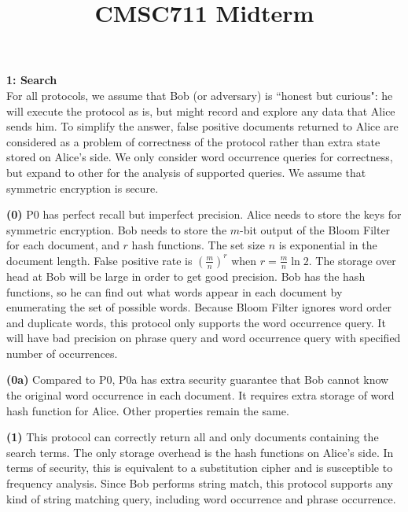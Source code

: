 \documentclass[10pt]{article}
\title{CMSC711 Midterm}
\newcommand\question[2]{\vspace{.1in}\textbf{#1: #2}\vspace{.5em}\vspace{.10in}}
\renewcommand\part[1]{\vspace{.10in}\textbf{(#1)}}
\begin{document}
\raggedright
\newcommand\NAME{Shi Feng}

\question{1}{Search}\\
For all protocols, we assume that Bob (or adversary) is ``honest but curious": he
will execute the protocol as is, but might record and explore any data that
Alice sends him. To simplify the answer, false positive documents returned to
Alice are considered as a problem of correctness of the protocol rather than extra
state stored on Alice's side. We only consider word occurrence queries for
correctness, but expand to other for the analysis of supported queries. We
assume that symmetric encryption is secure.

\part{0}
P0 has perfect recall but imperfect precision.
Alice needs to store the keys for symmetric encryption. Bob needs to store the
$m$-bit output of the Bloom Filter for each document, and $r$ hash functions.
The set size $n$ is exponential in the document length.  False positive rate is
$(\frac{m}{n})^r$ when $r=\frac{m}{n}\ln 2$. The storage over head at Bob will
be large in order to get good precision.
Bob has the hash functions, so he can find out what words appear
in each document by enumerating the set of possible words. Because Bloom Filter
ignores word order and duplicate words, this protocol only supports the word
occurrence query. It will have bad precision on phrase query and word occurrence
query with specified number of occurrences.

\part{0a}
Compared to P0, P0a has extra security guarantee that Bob cannot know the
original word occurrence in each document.
It requires extra storage of word hash function for Alice.
Other properties remain the same.

\part{1}
This protocol can correctly return all and only documents containing the search
terms. 
The only storage overhead is the hash functions on Alice's side. 
In terms of security, this is equivalent to a substitution cipher and is
susceptible to frequency analysis.
Since Bob performs string match, this protocol supports any kind of string
matching query, including word occurrence and phrase occurrence.
\end{document}
